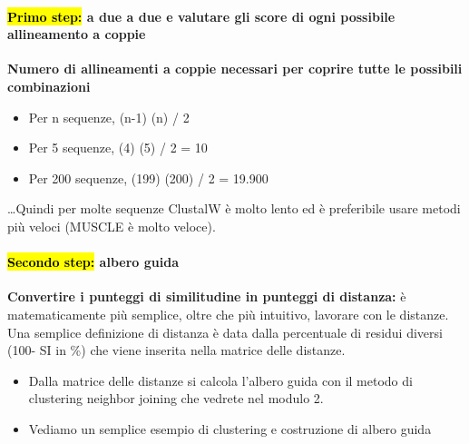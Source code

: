 \documentclass{article}
\begin{document}
\paragraph{\hl{Primo step:} a due a due e valutare gli score di ogni possibile allineamento a coppie\\}
\textbf{Numero di allineamenti a coppie necessari per coprire tutte le possibili combinazioni}
\begin{itemize}
    \item Per n sequenze, (n-1) (n) / 2
    \item Per 5 sequenze, (4) (5) / 2 = 10
    \item Per 200 sequenze, (199) (200) / 2 = 19.900
\end{itemize}…Quindi per molte sequenze ClustalW è molto lento ed è preferibile usare metodi più veloci (MUSCLE è molto veloce).
\paragraph{\hl{Secondo step:} albero guida\\}
\textbf{Convertire i punteggi di similitudine in punteggi di distanza:} è matematicamente più semplice, oltre che più intuitivo, lavorare con le distanze. Una semplice definizione di distanza è data dalla percentuale di
residui diversi (100- SI in \%) che viene inserita nella matrice delle distanze.
\begin{itemize}
    \item Dalla matrice delle distanze si calcola l'albero guida con il metodo di clustering neighbor joining che vedrete nel modulo 2.
    \item Vediamo un semplice esempio di clustering e costruzione di albero guida
\end{itemize}
\end{document}
